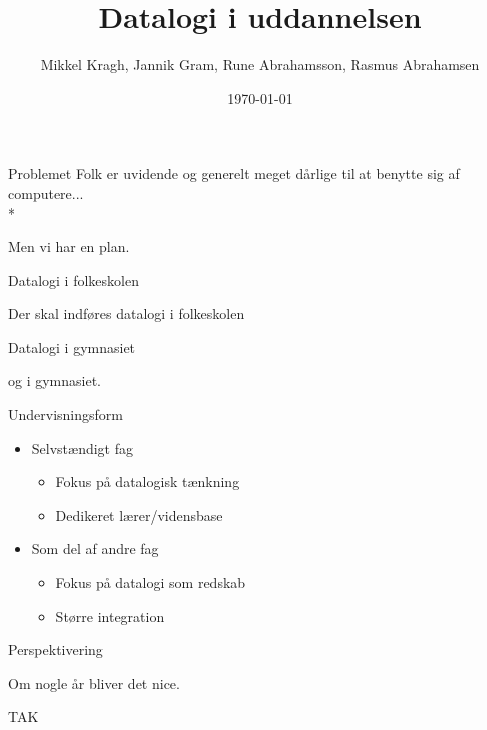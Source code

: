 \documentclass{beamer}
\title[Datalogi i uddannelsen]{Datalogi i uddannelsen}
\author{Mikkel Kragh, Jannik Gram, Rune Abrahamsson, Rasmus Abrahamsen}
\institute{DIKU}
\date{\today}
\begin{document}
\begin{frame}
\titlepage
\end{frame}


\begin{frame}{Problemet}
Folk er uvidende og generelt meget dårlige til at benytte sig af computere... \\*

Men vi har en plan.

\end{frame}

\begin{frame}{Datalogi i folkeskolen}

Der skal indføres datalogi i folkeskolen

\end{frame}

\begin{frame}{Datalogi i gymnasiet}

og i gymnasiet.

\end{frame}

\begin{frame}{Undervisningsform}
\begin{itemize}
\item Selvstændigt fag
\begin{itemize}
\item Fokus på datalogisk tænkning
\item Dedikeret lærer/vidensbase
\end{itemize}
\item Som del af andre fag
\begin{itemize}
\item Fokus på datalogi som redskab
\item Større integration
\end{itemize}
\end{itemize}
\end{frame}

\begin{frame}{Perspektivering}

Om nogle år bliver det nice.

\end{frame}

\begin{frame}{TAK}

\end{frame}
\end{document}
